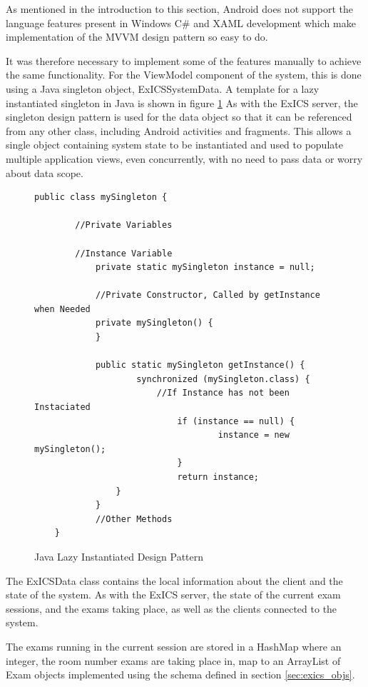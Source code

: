 \FloatBarrier

As mentioned in the introduction to this section, Android does not support the language features present in Windows C\# and XAML development which make implementation of the MVVM design pattern so easy to do.

It was therefore necessary to implement some of the features manually to achieve the same functionality.  For the ViewModel component of the system, this is done using a Java singleton object, ExICSSystemData.  A template for a lazy instantiated singleton in Java is shown in figure \ref{fig:java_singleton}  As with the ExICS server, the singleton design pattern is used for the data object so that it can be referenced from any other class, including Android activities and fragments\cite{fragments}.  This allows a single object containing system state to be instantiated and used to populate multiple application views, even concurrently, with no need to pass data or worry about data scope.

\begin{figure}[h]
	\centering
	\lstset{language=Java}
	\begin{lstlisting}[tabsize=2,breaklines=true]
	public class mySingleton {

		//Private Variables

		//Instance Variable
			private static mySingleton instance = null;

			//Private Constructor, Called by getInstance when Needed
			private mySingleton() {
			}

			public static mySingleton getInstance() {
					synchronized (mySingleton.class) {
						//If Instance has not been Instaciated
							if (instance == null) {
									instance = new mySingleton();
							}
							return instance;
				}
			}
			//Other Methods
	}
	\end{lstlisting}
	\caption{Java Lazy Instantiated Design Pattern}
	\label{fig:java_singleton}
\end{figure}

The ExICSData class contains the local information about the client and the state of the system.  As with the ExICS server, the state of the current exam sessions, and the exams taking place, as well as the clients connected to the system.

The exams running in the current session are stored in a HashMap where an integer, the room number exams are taking place in, map to an ArrayList of Exam objects implemented using the schema defined in section \ref{sec:exics_objs}.

